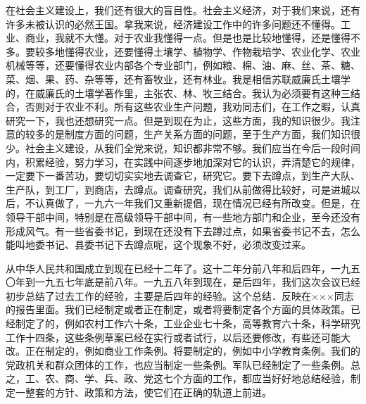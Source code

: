 在社会主义建设上，我们还有很大的盲目性。社会主义经济，对于我们来说，还有许多未被认识的必然王国。拿我来说，经济建设工作中的许多问题还不懂得。工业、商业，我就不大懂。对于农业我懂得一点。但是也是比较地懂得，还是懂得不多。要较多地懂得农业，还要懂得土壤学、植物学、作物栽培学、农业化学、农业机械等等，还要懂得农业内部各个专业部门，例如粮、棉、油、麻、丝、茶、糖、菜、烟、果、药、杂等等，还有畜牧业，还有林业。我是相信苏联威廉氏土壤学的，在威廉氏的土壤学著作里，主张农、林、牧三结合。我认为必须要有这种三结合，否则对于农业不利。所有这些农业生产问题，我劝同志们，在工作之暇，认真研究一下，我也还想研究一点。但是到现在为止，这些方面，我的知识很少。我注意的较多的是制度方面的问题，生产关系方面的问题，至于生产方面，我们知识很少。社会主义建设，从我们全党来说，知识都非常不够。我们应当在今后一段时间内，积累经验，努力学习，在实践中间逐步地加深对它的认识，弄清楚它的规律，一定要下一番苦功，要切切实实地去调查它，研究它。要下去蹲点，到生产大队、生产队，到工厂，到商店，去蹲点。调查研究，我们从前做得比较好，可是进城以后，不认真做了，一九六一年我们又重新提倡，现在情况已经有所改变。但是，在领导干部中间，特别是在高级领导干部中间，有一些地方部门和企业，至今还没有形成风气。有一些省委书记，到现在还没有下去蹲过点，如果省委书记不去，怎么能叫地委书记、县委书记下去蹲点呢，这个现象不好，必须改变过来。

从中华人民共和国成立到现在已经十二年了。这十二年分前八年和后四年，一九五〇年到一九五七年底是前八年。一九五八年到现在，是后四年，我们这次会议已经初步总结了过去工作的经验，主要是后四年的经验。这个总结．反映在×××同志的报告里面。我们已经制定或者正在制定，或者将要制定各个方面的具体政策。已经制定了的，例如农村工作六十条，工业企业七十条，高等教育六十条，科学研究工作十四条，这些条例草案已经在实行或者试行，以后还要修改，有些还可能大改。正在制定的，例如商业工作条例。将要制定的，例如中小学教育条例。我们的党政机关和群众团体的工作，也应当制定一些条例。军队已经制定了一些条例。总之，工、农、商、学、兵、政、党这七个方面的工作，都应当好好地总结经验，制定一整套的方针、政策和方法，使它们在正确的轨道上前进。

